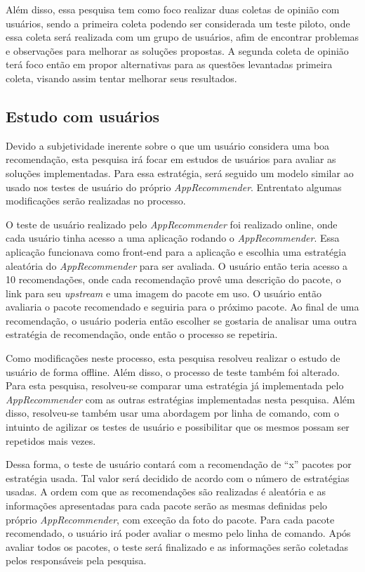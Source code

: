 Além disso, essa pesquisa tem como foco realizar duas coletas de opinião com usuários,
sendo a primeira coleta podendo ser considerada um teste piloto, onde essa
coleta será realizada com um grupo de usuários, afim de encontrar problemas e
observações para melhorar as soluções propostas. A segunda coleta de opinião
terá foco então em propor alternativas para as questões levantadas
primeira coleta, visando assim tentar melhorar seus resultados.

\subsection{Estudo com usuários}\label{sec:estudo_usuario}

Devido a subjetividade inerente sobre o que um usuário considera uma boa
recomendação, esta pesquisa irá focar em estudos de usuários para
avaliar as soluções implementadas. Para essa estratégia, será seguido um modelo
similar ao usado nos testes de usuário do próprio \textit{AppRecommender}. Entrentato
algumas modificações serão realizadas no processo.

O teste de usuário realizado pelo \textit{AppRecommender} foi realizado online, onde cada
usuário tinha acesso a uma aplicação rodando o \textit{AppRecommender}. Essa aplicação
funcionava como front-end para a aplicação e escolhia uma estratégia aleatória
do \textit{AppRecommender} para ser avaliada. O usuário então teria acesso a 10
recomendações, onde cada recomendação provê uma descrição do
pacote, o link para seu \textit{upstream} e uma imagem do pacote em uso. O
usuário então avaliaria o pacote recomendado e seguiria para o próximo pacote.
Ao final de uma recomendação, o usuário poderia então escolher se gostaria de
analisar uma outra estratégia de recomendação, onde então o processo se
repetiria.

Como modificações neste processo, esta pesquisa resolveu realizar o estudo de
usuário de forma offline. Além disso, o processo de teste também foi alterado.
Para esta pesquisa, resolveu-se comparar uma estratégia já implementada pelo
\textit{AppRecommender} com as outras estratégias implementadas nesta pesquisa.
Além disso, resolveu-se também usar uma abordagem por linha de
comando, com o intuinto de agilizar os testes de usuário e possibilitar que os
mesmos possam ser repetidos mais vezes.

Dessa forma, o teste de usuário contará com a recomendação de ``x'' pacotes por
estratégia usada. Tal valor será decidido de acordo com o número de estratégias
usadas. A ordem com que
as recomendações são realizadas é aleatória e as informações apresentadas
para cada pacote serão as mesmas definidas pelo próprio \textit{AppRecommender}, com
exceção da foto do pacote. Para cada pacote recomendado, o usuário irá poder
avaliar o mesmo pelo linha de comando. Após avaliar todos os pacotes, o teste
será finalizado e as informações serão coletadas pelos responsáveis pela
pesquisa.

